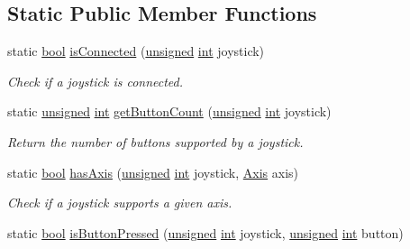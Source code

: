 \subsection*{Static Public Member Functions}
\begin{DoxyCompactItemize}
\item 
static \hyperlink{term__entry_8h_a002004ba5d663f149f6c38064926abac}{bool} \hyperlink{classsf_1_1_joystick_ac7d4e1923e9f9420174f26703ea63d6c}{is\-Connected} (\hyperlink{curses_8priv_8h_aca40206900cfc164654362fa8d4ad1e6}{unsigned} \hyperlink{term__entry_8h_ad65b480f8c8270356b45a9890f6499ae}{int} joystick)
\begin{DoxyCompactList}\small\item\em Check if a joystick is connected. \end{DoxyCompactList}\item 
static \hyperlink{curses_8priv_8h_aca40206900cfc164654362fa8d4ad1e6}{unsigned} \hyperlink{term__entry_8h_ad65b480f8c8270356b45a9890f6499ae}{int} \hyperlink{classsf_1_1_joystick_a4de9f445c6582bfe9f0873f695682885}{get\-Button\-Count} (\hyperlink{curses_8priv_8h_aca40206900cfc164654362fa8d4ad1e6}{unsigned} \hyperlink{term__entry_8h_ad65b480f8c8270356b45a9890f6499ae}{int} joystick)
\begin{DoxyCompactList}\small\item\em Return the number of buttons supported by a joystick. \end{DoxyCompactList}\item 
static \hyperlink{term__entry_8h_a002004ba5d663f149f6c38064926abac}{bool} \hyperlink{classsf_1_1_joystick_a268e8f2a11ae6af4a47c727cb4ab4d95}{has\-Axis} (\hyperlink{curses_8priv_8h_aca40206900cfc164654362fa8d4ad1e6}{unsigned} \hyperlink{term__entry_8h_ad65b480f8c8270356b45a9890f6499ae}{int} joystick, \hyperlink{classsf_1_1_joystick_a48db337092c2e263774f94de6d50baa7}{Axis} axis)
\begin{DoxyCompactList}\small\item\em Check if a joystick supports a given axis. \end{DoxyCompactList}\item 
static \hyperlink{term__entry_8h_a002004ba5d663f149f6c38064926abac}{bool} \hyperlink{classsf_1_1_joystick_ae0d97a4b84268cbe6a7078e1b2717835}{is\-Button\-Pressed} (\hyperlink{curses_8priv_8h_aca40206900cfc164654362fa8d4ad1e6}{unsigned} \hyperlink{term__entry_8h_ad65b480f8c8270356b45a9890f6499ae}{int} joystick, \hyperlink{curses_8priv_8h_aca40206900cfc164654362fa8d4ad1e6}{unsigned} \hyperlink{term__entry_8h_ad65b480f8c8270356b45a9890f6499ae}{int} button)

\end{DoxyCompactItemize}
